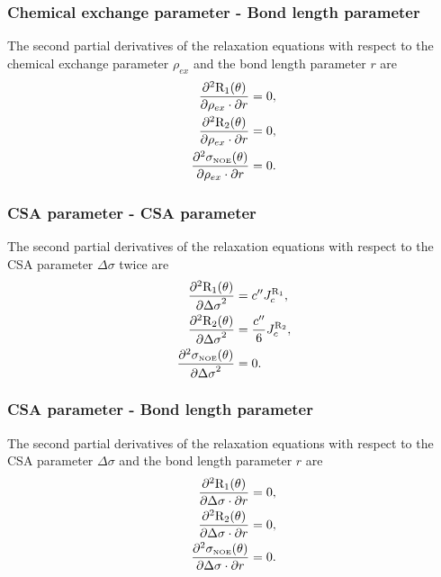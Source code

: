\subsubsection{Chemical exchange parameter - Bond length parameter}

The second partial derivatives of the relaxation equations with respect to the chemical exchange parameter $\rho_{ex}$ and the bond length parameter $r$ are
\begin{align}
    \frac{\partial^2 \mathrm{R}_1(\theta)}{\partial \rho_{ex} \cdot \partial r} &= 0,           \label{eq: Ri': d2R1/dRex.dr} \\
    \frac{\partial^2 \mathrm{R}_2(\theta)}{\partial \rho_{ex} \cdot \partial r} &= 0,           \label{eq: Ri': d2R2/dRex.dr} \\
    \frac{\partial^2 \sigma_{\scriptscriptstyle \mathrm{NOE}}(\theta)}{\partial \rho_{ex} \cdot \partial r} &= 0.    \label{eq: Ri': d2sigmaNOE/dRex.dr}
\end{align}


\subsubsection{CSA parameter - CSA parameter}

The second partial derivatives of the relaxation equations with respect to the CSA parameter $\Delta\sigma$ twice are
\begin{align}
    \frac{\partial^2 \mathrm{R}_1(\theta)}{{\partial \Delta\sigma}^2} &= c'' J_c^{\mathrm{R}_1},              \label{eq: Ri': d2R1/dCSA2} \\
    \frac{\partial^2 \mathrm{R}_2(\theta)}{{\partial \Delta\sigma}^2} &= \frac{c''}{6} J_c^{\mathrm{R}_2},    \label{eq: Ri': d2R2/dCSA2} \\
    \frac{\partial^2 \sigma_{\scriptscriptstyle \mathrm{NOE}}(\theta)}{{\partial \Delta\sigma}^2} &= 0.                   \label{eq: Ri': d2sigmaNOE/dCSA2}
\end{align}


\subsubsection{CSA parameter - Bond length parameter}

The second partial derivatives of the relaxation equations with respect to the CSA parameter $\Delta\sigma$ and the bond length parameter $r$ are
\begin{align}
    \frac{\partial^2 \mathrm{R}_1(\theta)}{\partial \Delta\sigma \cdot \partial r} &= 0,         \label{eq: Ri': d2R1/dCSA.dr} \\
    \frac{\partial^2 \mathrm{R}_2(\theta)}{\partial \Delta\sigma \cdot \partial r} &= 0,         \label{eq: Ri': d2R2/dCSA.dr} \\
    \frac{\partial^2 \sigma_{\scriptscriptstyle \mathrm{NOE}}(\theta)}{\partial \Delta\sigma \cdot \partial r} &= 0.  \label{eq: Ri': d2sigmaNOE/dCSA.dr}
\end{align}


